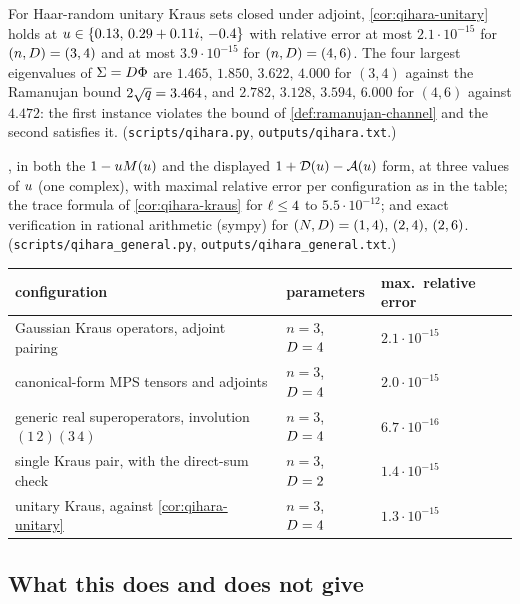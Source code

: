 \begin{numerical}
\label{num:qihara-unitary}
For Haar-random unitary Kraus sets closed under adjoint, \cref{cor:qihara-unitary} holds at $u\in\{0.13,\,0.29+0.11i,\,-0.4\}$ with
relative error at most $2.1\cdot10^{-15}$ for $(n,D) = (3,4)$ and at most $3.9\cdot10^{-15}$ for $(n,D) = (4,6)$. The four largest
eigenvalues of $\Sigma = D\Phi$ are $1.465,\,1.850,\,3.622,\,4.000$ for $(3,4)$ against the Ramanujan bound $2\sqrt{q} = 3.464$, and
$2.782,\,3.128,\,3.594,\,6.000$ for $(4,6)$ against $4.472$: the first instance violates the bound of \cref{def:ramanujan-channel} and the
second satisfies it. (\texttt{scripts/qihara.py}, \texttt{outputs/qihara.txt}.)
\end{numerical}

\begin{numerical}
\label{num:qihara-general}
, in both the $1-u M(u)$ and the displayed $1+\mathcal D(u)-\mathcal A(u)$ form, at three values of $u$ (one complex), with
maximal relative error per configuration as in the table; the trace formula of \cref{cor:qihara-kraus} for $\ell\le4$ to $5.5\cdot10^{-12}$;
and exact verification in rational arithmetic (sympy) for $(N,D) = (1,4),\,(2,4),\,(2,6)$. (\texttt{scripts/qihara\_general.py},
\texttt{outputs/qihara\_general.txt}.)
\begin{center}
\begin{tabular}{lll}
\toprule
configuration & parameters & max.\ relative error \\
\midrule
Gaussian Kraus operators, adjoint pairing & $n=3$, $D=4$ & $2.1\cdot10^{-15}$ \\
canonical-form MPS tensors and adjoints & $n=3$, $D=4$ & $2.0\cdot10^{-15}$ \\
generic real superoperators, involution $(1\,2)(3\,4)$ & $n=3$, $D=4$ & $6.7\cdot10^{-16}$ \\
single Kraus pair, with the direct-sum check & $n=3$, $D=2$ & $1.4\cdot10^{-15}$ \\
unitary Kraus, against \cref{cor:qihara-unitary} & $n=3$, $D=4$ & $1.3\cdot10^{-15}$ \\
\bottomrule
\end{tabular}
\end{center}
\end{numerical}

\subsection{What this does and does not give}

